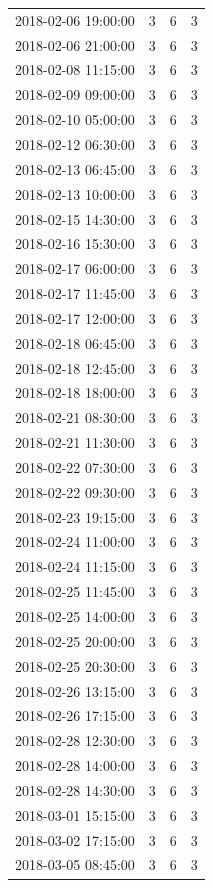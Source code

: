 \begin{tabular}{lrrr}
2018-02-06 19:00:00 & 3 & 6 & 3 \\
2018-02-06 21:00:00 & 3 & 6 & 3 \\
2018-02-08 11:15:00 & 3 & 6 & 3 \\
2018-02-09 09:00:00 & 3 & 6 & 3 \\
2018-02-10 05:00:00 & 3 & 6 & 3 \\
2018-02-12 06:30:00 & 3 & 6 & 3 \\
2018-02-13 06:45:00 & 3 & 6 & 3 \\
2018-02-13 10:00:00 & 3 & 6 & 3 \\
2018-02-15 14:30:00 & 3 & 6 & 3 \\
2018-02-16 15:30:00 & 3 & 6 & 3 \\
2018-02-17 06:00:00 & 3 & 6 & 3 \\
2018-02-17 11:45:00 & 3 & 6 & 3 \\
2018-02-17 12:00:00 & 3 & 6 & 3 \\
2018-02-18 06:45:00 & 3 & 6 & 3 \\
2018-02-18 12:45:00 & 3 & 6 & 3 \\
2018-02-18 18:00:00 & 3 & 6 & 3 \\
2018-02-21 08:30:00 & 3 & 6 & 3 \\
2018-02-21 11:30:00 & 3 & 6 & 3 \\
2018-02-22 07:30:00 & 3 & 6 & 3 \\
2018-02-22 09:30:00 & 3 & 6 & 3 \\
2018-02-23 19:15:00 & 3 & 6 & 3 \\
2018-02-24 11:00:00 & 3 & 6 & 3 \\
2018-02-24 11:15:00 & 3 & 6 & 3 \\
2018-02-25 11:45:00 & 3 & 6 & 3 \\
2018-02-25 14:00:00 & 3 & 6 & 3 \\
2018-02-25 20:00:00 & 3 & 6 & 3 \\
2018-02-25 20:30:00 & 3 & 6 & 3 \\
2018-02-26 13:15:00 & 3 & 6 & 3 \\
2018-02-26 17:15:00 & 3 & 6 & 3 \\
2018-02-28 12:30:00 & 3 & 6 & 3 \\
2018-02-28 14:00:00 & 3 & 6 & 3 \\
2018-02-28 14:30:00 & 3 & 6 & 3 \\
2018-03-01 15:15:00 & 3 & 6 & 3 \\
2018-03-02 17:15:00 & 3 & 6 & 3 \\
2018-03-05 08:45:00 & 3 & 6 & 3 \\

\end{tabular}
